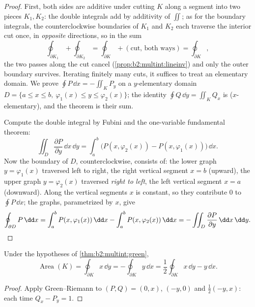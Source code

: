 \begin{proof}
First, both sides are additive under cutting $K$ along a
segment into two pieces $K_1, K_2$: the double integrals add
by additivity of $\iint$; as for the boundary integrals, the
counterclockwise boundaries of $K_1$ and $K_2$ each traverse
the interior cut once, in \emph{opposite} directions, so in
the sum
\[
\oint_{\partial K_1} + \oint_{\partial K_2}
= \oint_{\partial K} + (\text{cut, both ways})
= \oint_{\partial K},
\]
the two passes along the cut cancel
(\cref{prop:b2:multint:lineinv}) and only the outer boundary
survives. Iterating finitely many cuts, it suffices to treat
an elementary domain. We prove $\oint P\,\dd x = -\iint_K P_y$ on a
$y$-elementary domain $D = \{a \leq x \leq b,\ \varphi_1(x) \leq y
\leq \varphi_2(x)\}$; the identity $\oint Q\,\dd y = \iint_K Q_x$
is  ($x$-elementary), and the theorem is their sum.

Compute the double integral by Fubini and the one-variable
fundamental theorem:
\[
\iint_D \frac{\partial P}{\partial y}\,\dd x\,\dd y
= \int_a^b \bigl(P(x, \varphi_2(x)) - P(x, \varphi_1(x))\bigr)
\,\dd x .
\]
Now the boundary of $D$, counterclockwise, consists of: the lower
graph $y = \varphi_1(x)$ traversed left to right, the right
vertical segment $x = b$ (upward), the upper graph $y =
\varphi_2(x)$ traversed \emph{right to left}, the left vertical
segment $x = a$ (downward). Along the vertical segments $x$ is
constant, so they contribute $0$ to $\oint P\,\dd x$; the graphs,
parametrized by $x$, give
\[
\oint_{\partial D} P\,\dd x
= \int_a^b P(x, \varphi_1(x))\,\dd x
- \int_a^b P(x, \varphi_2(x))\,\dd x
= -\iint_D \frac{\partial P}{\partial y}\,\dd x\,\dd y .
\qedhere
\]
\end{proof}

\begin{corollary}\label{cor:b2:multint:area}
Under the hypotheses of \cref{thm:b2:multint:green},
\[
\operatorname{Area}(K)
= \oint_{\partial K} x\,\dd y
= -\oint_{\partial K} y\,\dd x
= \frac12\oint_{\partial K} x\,\dd y - y\,\dd x .
\]
\end{corollary}

\begin{proof}
Apply Green--Riemann to $(P, Q) = (0, x)$, $(-y, 0)$ and
$\frac12(-y, x)$: each time $Q_x - P_y = 1$.
\end{proof}

